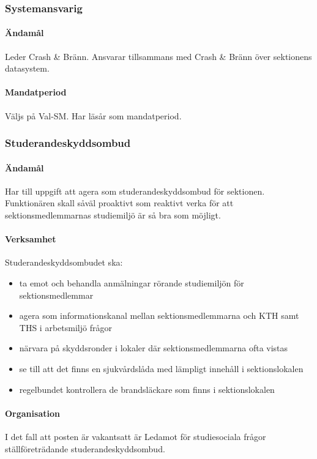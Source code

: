 \documentclass{dgovdoc}
\begin{document}
\subsubsection{Systemansvarig}

\paragraph{Ändamål}
Leder Crash \& Bränn. Ansvarar tillsammans med Crash \& Bränn över sektionens datasystem.

\paragraph{Mandatperiod}
Väljs på Val-SM. Har läsår som mandatperiod.

\subsubsection{Studerandeskyddsombud}

\paragraph{Ändamål}
Har till uppgift att agera som studerandeskyddsombud för sektionen. Funktionären skall såväl proaktivt som reaktivt verka för att sektionsmedlemmarnas studiemiljö är så bra som möjligt. 

\paragraph{Verksamhet}
Studerandeskyddsombudet ska:
\begin{itemize}
    \item ta emot och behandla anmälningar rörande studiemiljön för sektionsmedlemmar
    \item agera som informationskanal mellan sektionsmedlemmarna och KTH samt THS i arbetsmiljö frågor
    \item närvara på skyddsronder i lokaler där sektionsmedlemmarna ofta vistas
    \item se till att det finns en sjukvårdslåda med lämpligt innehåll i sektionslokalen
    \item regelbundet kontrollera de brandsläckare som finns i sektionslokalen
\end{itemize}

\paragraph{Organisation}
I det fall att posten är vakantsatt är Ledamot för studiesociala frågor ställföreträdande studerandeskyddsombud.
\end{document}
